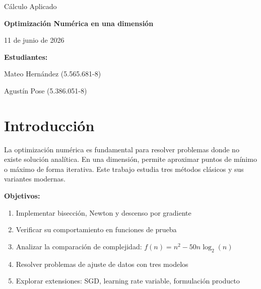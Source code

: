 \documentclass[12pt,a4paper]{article}
\begin{document}
\begin{titlepage}
    \centering
    \vspace*{2cm}
    {\Large Cálculo Aplicado\par}
    \vspace{2cm}
    {\LARGE \textbf{Optimización Numérica en una dimensión}\par}
    \vspace{2cm}
    {\large 11 de junio de 2026\par}
    \vspace{2cm}
    {\large \textbf{Estudiantes:}\par}
    \vspace{0.5cm}
    {\large Mateo Hernández (5.565.681-8)\par}
    {\large Agustín Pose (5.386.051-8)\par}
    \vfill
\end{titlepage}

\newpage

\tableofcontents
\newpage

\begin{abstract}
Este informe presenta la implementación y análisis de tres métodos clásicos de optimización numérica en una dimensión: bisección, Newton y descenso por gradiente. Se verifica su funcionamiento en funciones de prueba simples y en un problema de comparación de complejidad computacional. Además, se aplican a problemas de ajuste de datos con tres modelos distintos. Se incluyen extensiones (SGD, learning rate variable, formulación producto) que ilustran técnicas modernas de optimización.
\end{abstract}
\newpage

\section{Introducción}
La optimización numérica es fundamental para resolver problemas donde no existe solución analítica. En una dimensión, permite aproximar puntos de mínimo o máximo de forma iterativa. Este trabajo estudia tres métodos clásicos y sus variantes modernas.

\textbf{Objetivos:}
\begin{enumerate}
    \item Implementar bisección, Newton y descenso por gradiente
    \item Verificar su comportamiento en funciones de prueba
    \item Analizar la comparación de complejidad: $f(n)=n^2-50n\log_2(n)$
    \item Resolver problemas de ajuste de datos con tres modelos
    \item Explorar extensiones: SGD, learning rate variable, formulación producto
\end{enumerate}
\end{document}
